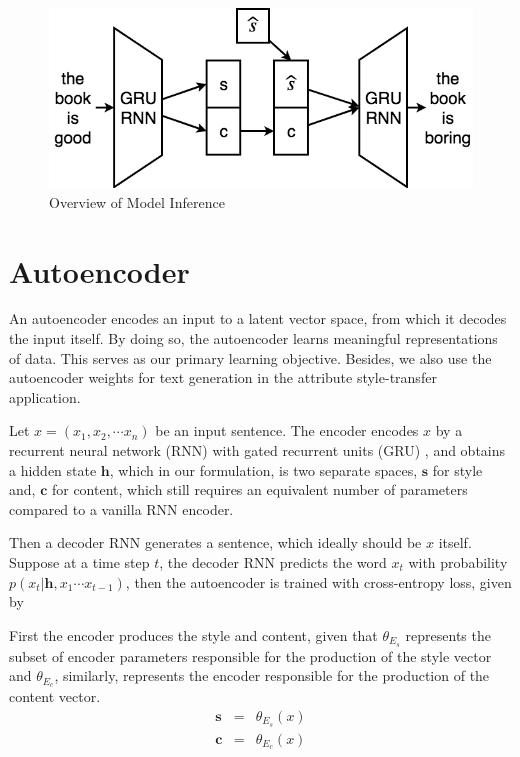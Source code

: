 \begin{figure}[ht]
	\centering
	\includegraphics[width=\linewidth]{images/model-overview-inference.png}
	\caption{Overview of Model Inference}
	\label{fig:model-overview-inference}
\end{figure}


\section{Autoencoder} \label{ssec:seq2seq-objective}

An autoencoder encodes an input to a latent vector space, from which it decodes the input itself. By doing so, the autoencoder learns meaningful representations of data. This serves as our primary learning objective. Besides, we also use the autoencoder weights  for text generation in the attribute style-transfer application.

Let $x=(x_1, x_2, \cdots x_n)$ be an input sentence. The encoder encodes $x$ by a recurrent neural network (RNN) with gated recurrent units (GRU) \citep{cho2014learning}, and obtains a hidden state $\bm h$, which in our formulation, is two separate spaces, $\bm s$ for style and, $\bm c$ for content, which still requires an equivalent number of parameters compared to a vanilla RNN encoder.

Then a decoder RNN generates a sentence, which ideally should be $x$ itself. Suppose at a time step $t$, the decoder RNN predicts the word $x_t$ with probability $p(x_t | \bm h, x_1 \cdots x_{t-1})$, then the autoencoder is trained with cross-entropy loss, given by

First the encoder produces the style and content, given that $\theta_{E_s}$ represents the subset of encoder parameters responsible for the production of the style vector and $\theta_{E_c}$, similarly, represents the encoder responsible for the production of the content vector.
\begin{eqnarray} \label{eqn:dae-rec-1}
	\bm s &=& \theta_{E_s}(x) \nonumber \\
	\bm c &=& \theta_{E_c}(x) \nonumber
\end{eqnarray}

